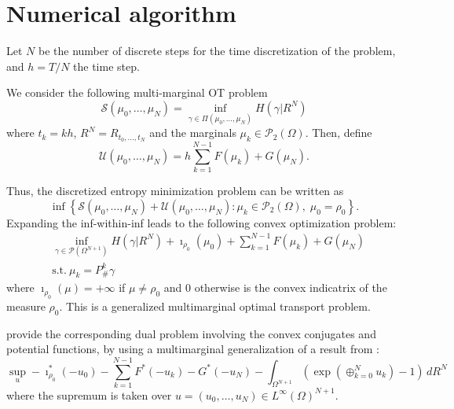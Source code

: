 \documentclass{article}
\newcommand{\calP}{\mathcal{P}}
\newcommand{\calS}{\mathcal{S}}
\newcommand{\suchthat}{\mathrm{s.t.}}
\begin{document}
    
    
    \section{Numerical algorithm}
    
    
    Let $N$ be the number of discrete steps for the time discretization of the problem, and $h=T/N$ the time step.
    
    We consider the following multi-marginal OT problem
    \begin{equation}
    	\calS(\mu_0,\ldots,\mu_N) =
    	\inf_{\gamma \in \Pi(\mu_0, \ldots, \mu_N)}
    	H(\gamma|R^N)
    \end{equation}
    where $t_k = kh$, $R^N = R_{t_0,\ldots,t_N}$ and the marginals $\mu_k \in \calP_2(\Omega)$.
    Then, define
    \[
    	\mathcal{U}(\mu_0,\ldots,\mu_N) = h\sum_{k=1}^{N-1} F(\mu_k) + G(\mu_N).
    \]
    
    Thus, the discretized entropy minimization problem can be written as
    \[
    	\inf\left\{
    	\calS(\mu_0, \ldots, \mu_N) +
    	\mathcal{U}(\mu_0, \ldots, \mu_N)
    	: \mu_k \in \calP_2(\Omega),\; \mu_0 = \rho_0
    	\right\}.
    \]
    Expanding the inf-within-inf leads to the following convex optimization problem:
    \begin{equation}
    \begin{aligned}
    	&\inf_{\gamma \in \calP(\Omega^{N+1})}
    	H(\gamma | R^N) + \imath_{\rho_0}(\mu_0) + \sum_{k=1}^{N-1} F(\mu_k) + G(\mu_N) \\
    	&\suchthat\ \mu_k = P^k_\#\gamma
    \end{aligned}
    \end{equation}
    where $\imath_{\rho_0}(\mu) = +\infty$ if $\mu\neq \rho_0$ and $0$ otherwise is the convex indicatrix of the measure $\rho_0$. This is a generalized multimarginal optimal transport problem.
    
    \textcite{benamou2018entropy} provide the corresponding dual problem involving the convex conjugates and potential functions, by using a multimarginal generalization of a result from \textcite{chizat2016scaling}:
    \begin{equation}\label{eq:TimeDiscreteDual}
    	\sup_u -\imath_{\rho_0}^*(-u_0) - \sum_{k=1}^{N-1} F^*(-u_k) - G^*(-u_N)
    	- \int_{\Omega^{N+1}} \left(\exp\left(\oplus_{k=0}^N u_k\right)-1\right) \,dR^N
    \end{equation}
    where the supremum is taken over $u = (u_0,\ldots,u_N) \in L^\infty(\Omega)^{N+1}$.
    
\end{document}
